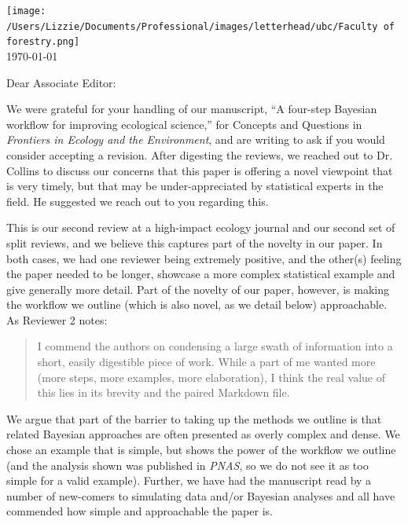 \documentclass[11pt]{article}
\begin{document}

\renewcommand{\refname}{\CHead{}}

\hspace{-5ex} \texttt{[image: /Users/Lizzie/Documents/Professional/images/letterhead/ubc/Faculty of forestry.png]}
\vspace{1.5ex}\\

\setlength{\parindent}{0pt}
\setlength{\parskip}{7pt}
\today

Dear Associate Editor:

We were grateful for your handling of our manuscript, ``A four-step Bayesian workflow for improving ecological science,'' for Concepts and Questions in \emph{Frontiers in Ecology and the Environment}, and are writing to ask if you would consider accepting a revision. After digesting the reviews, we reached out to Dr. Collins to discuss our concerns that this paper is offering a novel viewpoint that is very timely, but that may be under-appreciated by statistical experts in the field. He suggested we reach out to you regarding this. 

This is our second review at a high-impact ecology journal and our second set of split reviews, and we believe this captures part of the novelty in our paper. In both cases, we had one reviewer being extremely positive, and the other(s) feeling the paper needed to be longer, showcase a more complex statistical example and give generally more detail. Part of the novelty of our paper, however, is making the workflow we outline (which is also novel, as we detail below) approachable. As Reviewer 2 notes:
\begin{quote}
I commend the authors on condensing a large swath of information into a short, easily digestible piece of work. While a part of me
wanted more (more steps, more examples, more elaboration), I think the real value of this lies in its
brevity and the paired Markdown file.
\end{quote}
We argue that part of the barrier to taking up the methods we outline is that related Bayesian approaches are often presented as overly complex and dense. We chose an example that is simple, but shows the power of the workflow we outline (and the analysis shown was published in \emph{PNAS}, so we do not see it as too simple for a valid example). Further, we have had the manuscript read by a number of new-comers to simulating data and/or Bayesian analyses and all have commended how simple and approachable the paper is. 
\end{document}
